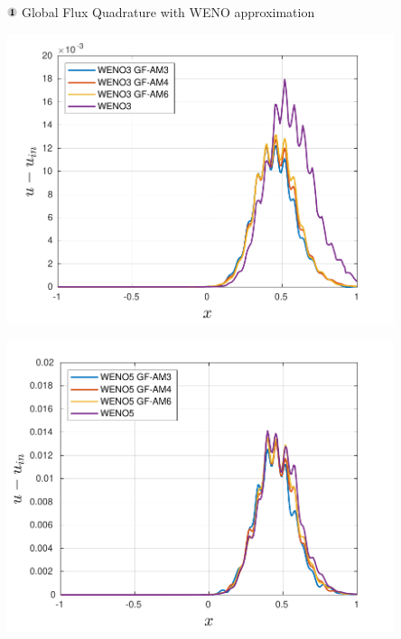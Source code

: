 \begin{frame}[t]{\includegraphics[width=0.3cm]{circle1} Global Flux Quadrature  with WENO approximation}
{	
	\begin{minipage}{0.5\textwidth}
		\centering\includegraphics[width=0.85\textwidth]{../figs/WENO-FD/figures/Burgers/perturbations/weno3_AM_error_pert0p005} 
	\end{minipage}\hfill
	\begin{minipage}{0.5\textwidth}
		\centering\includegraphics[width=0.85\textwidth]{../figs/WENO-FD/figures/Burgers/perturbations/weno5_AM_error_pert0p005} 
	\end{minipage}
}

\end{frame}
